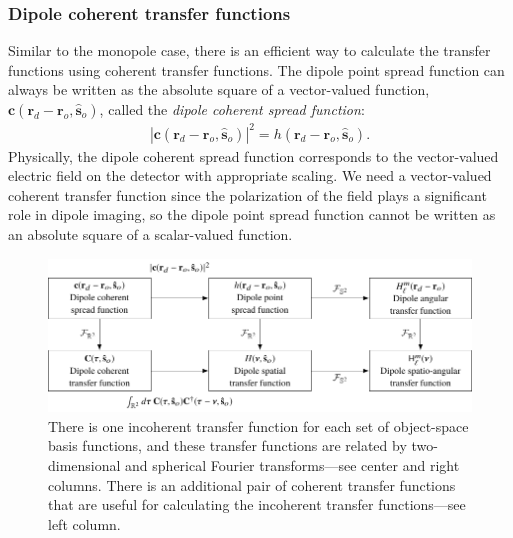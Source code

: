 \documentclass[]{osa-article}
\providecommand{\mb}[1]{\mathbf{#1}}
\providecommand{\ro}{\mathbf{\mathbf{r}}_o}
\providecommand{\so}{\mathbf{\hat{s}}_o}
\providecommand{\rd}{\mathbf{r}_d}
\begin{document}
\subsubsection{Dipole coherent transfer functions}
Similar to the monopole case, there is an efficient way to calculate the
transfer functions using coherent transfer functions. The dipole point spread
function can always be written as the absolute square of a vector-valued
function, $\mb{c}(\rd - \ro, \so)$, called the \textit{dipole coherent spread
  function}:
\begin{align}
  |\mb{c}(\rd - \ro, \so)|^2 = h(\rd - \ro, \so). \label{eq:absquare2}
\end{align}
Physically, the dipole coherent spread function corresponds to the vector-valued
electric field on the detector with appropriate scaling. We need a vector-valued
coherent transfer function since the polarization of the field plays a
significant role in dipole imaging, so the dipole point spread function cannot
be written as an absolute square of a scalar-valued function.

\begin{figure}
  \hspace{-2em}
  \includegraphics[scale=1.0]{../figures/transfer-functions/transfer-functions.pdf}
  \caption{There is one incoherent transfer function for each set of
    object-space basis functions, and these transfer functions are related by
    two-dimensional and spherical Fourier transforms---see center and right
    columns. There is an additional pair of coherent transfer functions that
    are useful for calculating the incoherent transfer functions---see left column.}
   \label{fig:transfer-functions}
 \end{figure}
    
\end{document}
